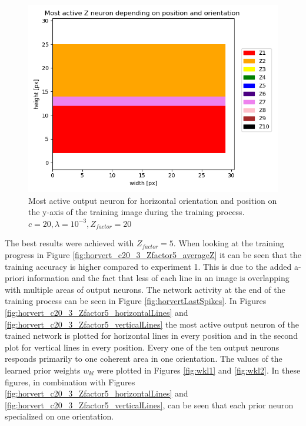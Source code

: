 \begin{figure}
  \includegraphics[width=\linewidth]{figures/horvert/horvert_c20_3_Zfactor20_horizontalLines.png}
  \caption{Most active output neuron for horizontal orientation and position on the y-axis of the training image during the training process. $c = 20, \lambda = 10^{-3}, Z_{factor} = 20$}
  \label{fig:horvert_c20_3_Zfactor20_horizontalLines}
\end{figure}


The best results were achieved with $Z_{factor} = 5$. When looking at the training progress in Figure \ref{fig:horvert_c20_3_Zfactor5_averageZ} it can be seen that the training accuracy is higher compared to experiment 1. This is due to the added a-priori information and the fact that less of each line in an image is overlapping with multiple areas of output neurons. The network activity at the end of the training process can be seen in Figure \ref{fig:horvertLastSpikes}. In Figures \ref{fig:horvert_c20_3_Zfactor5_horizontalLines} and \ref{fig:horvert_c20_3_Zfactor5_verticalLines} the most active output neuron of the trained network is plotted for horizontal lines in every position and in the second plot for vertical lines in every position. Every one of the ten output neurons responds primarily to one coherent area in one orientation. The values of the learned prior weights $w_{kl}$ were plotted in Figures \ref{fig:wkl1} and \ref{fig:wkl2}. In these figures, in combination with Figures \ref{fig:horvert_c20_3_Zfactor5_horizontalLines} and \ref{fig:horvert_c20_3_Zfactor5_verticalLines}, can be seen that each prior neuron specialized on one orientation.

